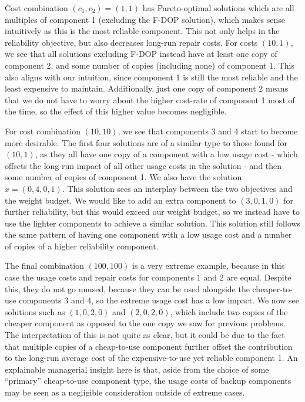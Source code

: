 \documentclass[11pt,authoryear,a4paper]{article}
\theoremstyle{definition}
\begin{document}
Cost combination $(c_1,c_2) = (1,1)$ has Pareto-optimal solutions which are all multiples of component 1 (excluding the F-DOP solution), which makes sense intuitively as this is the most reliable component. This not only helps in the reliability objective, but also decreases long-run repair costs. For costs $(10,1)$, we see that all solutions excluding F-DOP instead have at least one copy of component 2, and some number of copies (including none) of component 1. This also aligns with our intuition, since component 1 is still the most reliable and the least expensive to maintain. Additionally, just one copy of component 2 means that we do not have to worry about the higher cost-rate of component 1 most of the time, so the effect of this higher value becomes negligible.  

For cost combination $(10,10)$, we see that components 3 and 4 start to become more desirable. The first four solutions are of a similar type to those found for $(10,1)$, as they all have one copy of a component with a low usage cost - which offsets the long-run impact of all other usage costs in the solution - and then some number of copies of component 1. We also have the solution $x = (0,4,0,1)$. This solution sees an interplay between the two objectives and the weight budget. We would like to add an extra component to $(3,0,1,0)$ for further reliability, but this would exceed our weight budget, so we instead have to use the lighter components to achieve a similar solution. This solution still follows the same pattern of having one component with a low usage cost and a number of copies of a higher reliability component.

The final combination $(100,100)$ is a very extreme example, because in this case the usage costs and repair costs for components 1 and 2 are equal. Despite this, they do not go unused, because they can be used alongside the cheaper-to-use components 3 and 4, so the extreme usage cost has a low impact. We now see solutions such as $(1,0,2,0)$ and $(2,0,2,0)$, which include two copies of the cheaper component as opposed to the one copy we saw for previous problems. The interpretation of this is not quite as clear, but it could be due to the fact that multiple copies of a cheap-to-use component further offset the contribution to the long-run average cost of the expensive-to-use yet reliable component 1. An explainable managerial insight here is that, aside from the choice of some ``primary'' cheap-to-use component type, the usage costs of backup components may be seen as a negligible consideration outside of extreme cases. 
\end{document}
